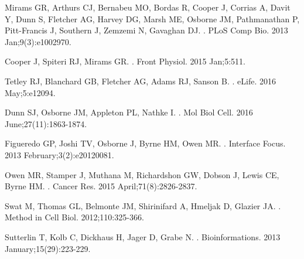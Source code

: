 \documentclass[10pt,letterpaper]{article}
\begin{document}
%
%
% 
\begin{thebibliography}{10}

Mirams GR, Arthurs CJ, Bernabeu MO, Bordas R, Cooper J, Corrias A, Davit Y, Dunn S, Fletcher AG, Harvey DG, Marsh ME, Osborne JM, Pathmanathan P, Pitt-Francis J, Southern J, Zemzemi N, Gavaghan DJ.
.
\newblock PLoS Comp Bio. 2013 Jan;9(3):e1002970.

Cooper J, Spiteri RJ, Mirams GR.
.
\newblock Front Physiol. 2015 Jan;5:511.

Tetley RJ, Blanchard GB, Fletcher AG, Adams RJ, Sanson B.
.
\newblock eLife. 2016 May;5:e12094.

Dunn SJ, Osborne JM, Appleton PL, Nathke I.
.
\newblock Mol Biol Cell. 2016 June;27(11):1863-1874.

Figueredo GP, Joshi TV, Osborne J, Byrne HM, Owen MR.
.
\newblock Interface Focus. 2013 February;3(2):e20120081.

Owen MR, Stamper J, Muthana M, Richardshon GW, Dobson J, Lewis CE, Byrne HM.
.
\newblock Cancer Res. 2015 April;71(8):2826-2837.

Swat M, Thomas GL, Belmonte JM, Shirinifard A, Hmeljak D, Glazier JA.
.
\newblock Method in Cell Biol. 2012;110:325-366.

Sutterlin T, Kolb C, Dickhaus H, Jager D, Grabe N.
.
\newblock Bioinformations. 2013 January;15(29):223-229.


\end{thebibliography}
\end{document}
